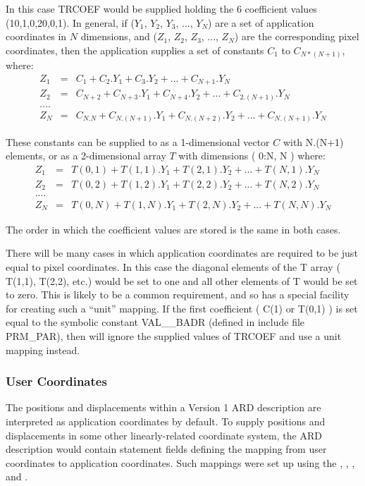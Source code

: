 In this case TRCOEF would be supplied holding the 6 coefficient values
(10,1,0,20,0,1). In general, if ($Y_{1}$, $Y_{2}$, $Y_{3}$, ..., $Y_{N}$) are a
set of application coordinates in $N$ dimensions, and ($Z_{1}$, $Z_{2}$,
$Z_{3}$, ..., $Z_{N}$) are the corresponding pixel coordinates, then the
application supplies a set of constants $C_{1}$ to $C_{N*(N+1)}$, where: 
\small
\begin{eqnarray*}
Z_{1} & = & C_{1} + C_{2}.Y_{1} + C_{3}.Y_{2} + ... + C_{N+1}.Y_{N} \\
Z_{2} & = & C_{N+2} + C_{N+3}.Y_{1} + C_{N+4}.Y_{2} + ... + C_{2.(N+1)}.Y_{N} \\
 ....\\
Z_{N} & = & C_{N.N} + C_{N.(N+1)}.Y_{1} + C_{N.(N+2)}.Y_{2} + ... + C_{N.(N+1)}.Y_{N} 
\end{eqnarray*}
\normalsize

These constants can be supplied to  as a 1-dimensional vector 
$C$ with N.(N+1) elements, or as a 2-dimensional array $T$ with dimensions 
( 0:N, N ) where:
\small
\begin{eqnarray*}
Z_{1} & = & T(0,1) + T(1,1).Y_{1} + T(2,1).Y_{2} + ... + T(N,1).Y_{N} \\
Z_{2} & = & T(0,2) + T(1,2).Y_{1} + T(2,2).Y_{2} + ... + T(N,2).Y_{N} \\
 ....\\
Z_{N} & = & T(0,N) + T(1,N).Y_{1} + T(2,N).Y_{2} + ... + T(N,N).Y_{N} 
\end{eqnarray*}
\normalsize

The order in which the coefficient values are stored is the same in both
cases.

There will be many cases in which application coordinates are required to be
just equal to pixel coordinates. In this case the diagonal elements of the T
array ( T(1,1), T(2,2), etc.) would be set to one and all other elements of T
would be set to zero. This is likely to be a common requirement, and so
 has a special facility for creating such a ``unit'' mapping. If the
first coefficient ( C(1) or T(0,1) ) is set equal to the symbolic constant
VAL\_\_BADR (defined in include file PRM\_PAR), then  will ignore the
supplied values of TRCOEF and use a unit mapping instead.

\subsubsection{User Coordinates}
The positions and displacements within a Version 1 ARD description are 
interpreted as
application coordinates by default. To supply positions
and displacements in some other linearly-related coordinate system, the ARD 
description would contain statement fields defining the mapping from user
coordinates to application coordinates. Such mappings were set up using the 
, 
, 
, 
 and
.

